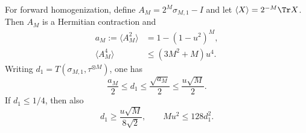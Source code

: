\begin{theorem}\label{thm:moments}
For forward homogenization, define $A_M=2^M\sigma_{M,1}-I$ and let $\langle X\rangle=2^{-M}\Tr X$. Then $A_M$ is a Hermitian contraction and
\begin{align}
 a_M:=\langle A_M^2\rangle&=1-(1-u^2)^M,\label{eq:purity}\\
 \langle A_M^4\rangle&\le(3M^2+M)u^4.\label{eq:fourth}
\end{align}
Writing $d_1=T(\sigma_{M,1},\tau^{\otimes M})$, one has
\begin{equation}
 \frac{a_M}{2}\le d_1\le\frac{\sqrt{a_M}}2\le\frac{u\sqrt M}{2}.
 \label{eq:basicreturn}
\end{equation}
If $d_1\le1/4$, then also
\begin{equation}
 d_1\ge\frac{u\sqrt M}{8\sqrt2},\qquad Mu^2\le128d_1^2.
 \label{eq:returnlower}
\end{equation}
\end{theorem}
